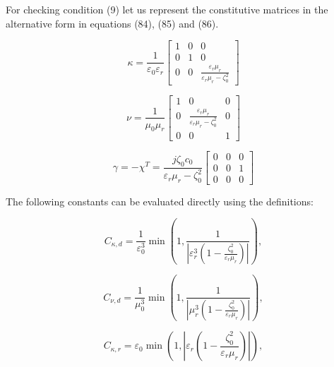 For checking condition (9) let us represent the constitutive matrices in the alternative form in equations (84), (85) and (86).

\begin{equation} \label{constitutive_kraft_kappa}
\tag{84}
\kappa = \frac{1}{\varepsilon_0\varepsilon_r}
\begin{bmatrix}
1 & 0 & 0 \\
0 & 1 & 0 \\
0 & 0 & \frac{\varepsilon_r\mu_r}{\varepsilon_r\mu_r-\zeta_0^2}
\end{bmatrix}
\end{equation}

\begin{equation} \label{constitutive_kraft_nu}
\tag{85}
\nu = \frac{1}{\mu_0\mu_r}
\begin{bmatrix}
1 & 0 & 0 \\
0 & \frac{\varepsilon_r\mu_r}{\varepsilon_r\mu_r - \zeta_0^2} & 0 \\
0 & 0 & 1
\end{bmatrix}
\end{equation}

\begin{equation} \label{constitutive_kraft_chi_gamma}
\tag{86}
\gamma = -\chi^T = \frac{j\zeta_0c_0}{\varepsilon_r\mu_r-\zeta_0^2}
\begin{bmatrix}
0 & 0 & 0 \\
0 & 0 & 1 \\
0 & 0 & 0
\end{bmatrix}
\end{equation}

The following constants can be evaluated directly using the definitions:

\begin{equation}
\tag{87}
C_{\kappa,d} =  \frac{1}{\varepsilon_0^3}\min(1, \frac{1}{|\varepsilon_r^3(1 - \frac{\zeta_0^2}{\varepsilon_r\mu_r})|}), 
\end{equation}

\begin{equation}
\tag{88}
C_{\nu,d} =  \frac{1}{\mu_0^3}\min(1, \frac{1}{|\mu_r^3(1 - \frac{\zeta_0^2}{\varepsilon_r\mu_r})|}),
\end{equation}

\begin{equation}
\tag{89}
C_{\kappa,r} = \varepsilon_0 \min(1, |\varepsilon_r (1 - \frac{\zeta_0^2}{\varepsilon_r\mu_r})|),
\end{equation}

